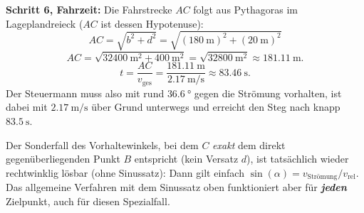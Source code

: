 \documentclass[addpoints,11pt,a4paper]{exam}
\begin{document}
\begin{vertiefungbox}
\textbf{Schritt 6, Fahrzeit:} Die Fahrstrecke $AC$ folgt aus Pythagoras im
Lageplandreieck ($AC$ ist dessen Hypotenuse):
\[
  AC = \sqrt{b^2+d^2} = \sqrt{(\SI{180}{\meter})^2+(\SI{20}{\meter})^2}
\]
\[
  AC = \sqrt{\SI{32400}{\meter\squared} + \SI{400}{\meter\squared}} = \sqrt{\SI{32800}{\meter\squared}} \approx \SI{181.11}{\meter}.
\]
\[
  t = \frac{AC}{v_{\text{ges}}} = \frac{\SI{181.11}{\meter}}{\SI{2.17}{\meter\per\second}} \approx \SI{83.46}{\second}.
\]
Der Steuermann muss also mit rund $\SI{36.6}{\degree}$ gegen die Strömung
vorhalten, ist dabei mit $\SI{2.17}{\meter\per\second}$ über Grund
unterwegs und erreicht den Steg nach knapp $\SI{83.5}{\second}$.

\begin{hinweisbox}
Der Sonderfall des Vorhaltewinkels, bei dem $C$ \emph{exakt} dem direkt
gegenüberliegenden Punkt $B$ entspricht (kein Versatz $d$), ist tatsächlich
wieder rechtwinklig lösbar (ohne Sinussatz): Dann gilt einfach
$\sin(\alpha)=v_{\text{Strömung}}/v_{\text{rel}}$. Das allgemeine Verfahren
mit dem Sinussatz oben funktioniert aber für \textbf{\emph{jeden}}
Zielpunkt, auch für diesen Spezialfall.
\end{hinweisbox}
\end{vertiefungbox}
\end{document}
